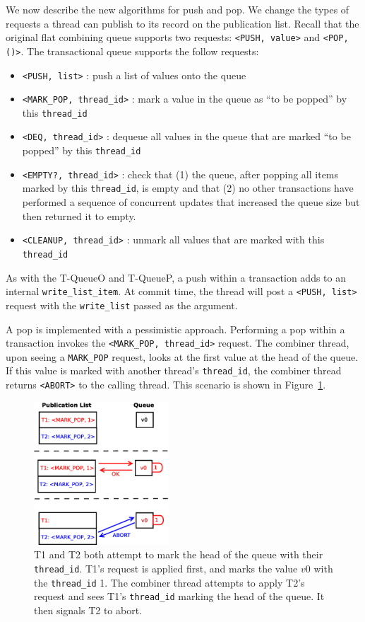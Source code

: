 We now describe the new algorithms for push and pop.  We change the types of requests a thread can publish to its record on the publication list. Recall that the original flat combining queue supports two requests: \texttt{<PUSH, value>} and \texttt{<POP, ()>}. The transactional queue supports the follow requests:
\begin{itemize}
    \item \texttt{<PUSH, list>} : push a list of values onto the queue
    \item \texttt{<MARK\_POP, thread\_id>} : mark a value in the queue as ``to be popped'' by this \texttt{thread\_id}
    \item \texttt{<DEQ, thread\_id>} : dequeue all values in the queue that are marked ``to be popped'' by this \texttt{thread\_id}
    \item \texttt{<EMPTY?, thread\_id>} : check that (1) the queue, after popping all items marked by this \texttt{thread\_id}, is empty and that (2) no other transactions have performed a sequence of concurrent updates that increased the queue size but then returned it to empty.
    \item \texttt{<CLEANUP, thread\_id>} : unmark all values that are marked with this \texttt{thread\_id}
\end{itemize}

As with the T-QueueO and T-QueueP, a push within a transaction adds to an internal \texttt{write\_list\_item}. At commit time, the thread will post a \texttt{<PUSH, list>} request with the \texttt{write\_list} passed as the argument.

A pop is implemented with a pessimistic approach. Performing a pop within a transaction invokes the \texttt{<MARK\_POP, thread\_id>} request. The combiner thread, upon seeing a \texttt{MARK\_POP} request, looks at the first value at the head of the queue. If this value is marked with another thread's \texttt{thread\_id}, the combiner thread returns \texttt{<ABORT>} to the calling thread. This scenario is shown in Figure~\ref{fig:fcqueue_abort1}.

\begin{figure}[t]
\centering
\includegraphics[width=0.45\textwidth]{fcqueue_abort1}
    \caption[Abort when performing conflicting pop requests]{T1 and T2 both attempt to mark the head of the queue with their \texttt{thread\_id}. T1's request is applied first, and marks the value $v0$ with the \texttt{thread\_id} 1. The combiner thread attempts to apply T2's request and sees T1's \texttt{thread\_id} marking the head of the queue. It then signals T2 to abort.}
\label{fig:fcqueue_abort1}
\end{figure}


